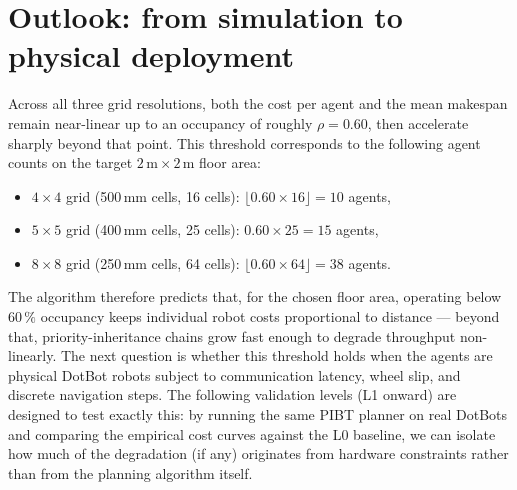 \documentclass[12pt,a4paper]{article}
\begin{document}
\section{Outlook: from simulation to physical deployment}

Across all three grid resolutions, both the cost per agent and the mean makespan
remain near-linear up to an occupancy of roughly $\rho = 0.60$, then accelerate
sharply beyond that point. This threshold corresponds to the following agent counts
on the target $2\,\text{m} \times 2\,\text{m}$ floor area:

\begin{itemize}
    \item $4\times4$ grid (500\,mm cells, 16 cells): $\lfloor 0.60 \times 16 \rfloor = 10$ agents,
    \item $5\times5$ grid (400\,mm cells, 25 cells): $0.60 \times 25 = 15$ agents,
    \item $8\times8$ grid (250\,mm cells, 64 cells): $\lfloor 0.60 \times 64 \rfloor = 38$ agents.
\end{itemize}

The algorithm therefore predicts that, for the chosen floor area, operating below
$60\,\%$ occupancy keeps individual robot costs proportional to distance --- beyond
that, priority-inheritance chains grow fast enough to degrade throughput
non-linearly. The next question is whether this threshold holds when the agents are
physical DotBot robots subject to communication latency, wheel slip, and discrete
navigation steps. The following validation levels (L1 onward) are designed to test
exactly this: by running the same PIBT planner on real DotBots and comparing the
empirical cost curves against the L0 baseline, we can isolate how much of the
degradation (if any) originates from hardware constraints rather than from the
planning algorithm itself.
\end{document}
